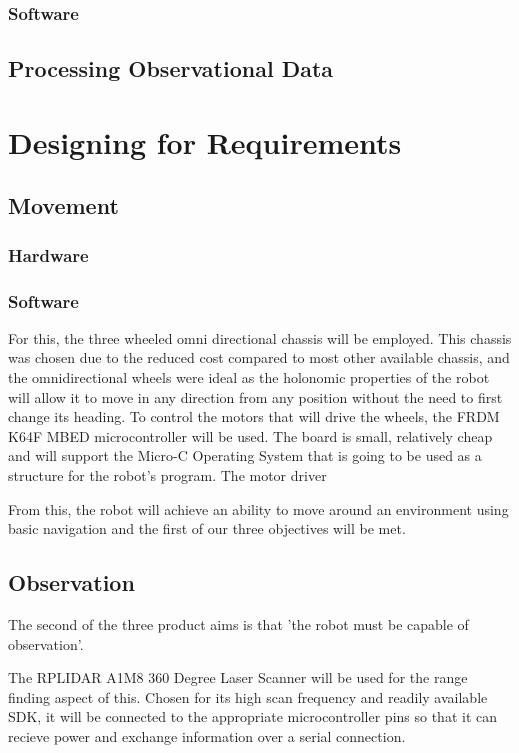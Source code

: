 				\subsubsection{Software}
			\subsection{Processing Observational Data}
	
	\section{Designing for Requirements}
		\subsection{Movement}
			
			\subsubsection{Hardware}
			\subsubsection{Software}		
			
		For this, the three wheeled omni directional chassis will be employed. This chassis was chosen due to the reduced cost compared to most other available chassis, and the omnidirectional wheels were ideal as the holonomic properties of the robot will allow it to move in any direction from any position without the need to first change its heading. To control the motors that will drive the wheels, the FRDM K64F MBED microcontroller will be used. The board is small, relatively cheap and will support the Micro-C Operating System that is going to be used as a structure for the robot's program. The motor driver
			
		From this, the robot will achieve an ability to move around an environment using basic navigation and the first of our three objectives will be met.
			
		\subsection{Observation}
		The second of the three product aims is that 'the robot must be capable of observation'.
			
		The RPLIDAR A1M8 360 Degree Laser Scanner will be used for the range finding aspect of this. Chosen for its high scan frequency and readily available SDK, it will be connected to the appropriate microcontroller pins so that it can recieve power and exchange information over a serial connection.
			
